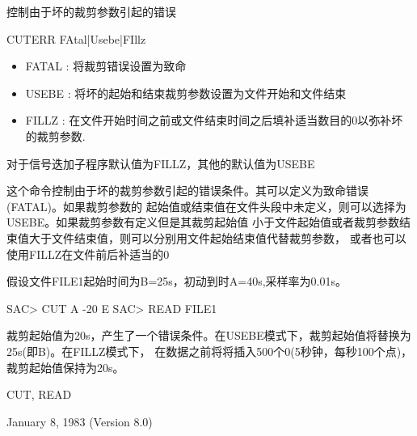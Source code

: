 \label{cmd:cuterr}

控制由于坏的裁剪参数引起的错误

CUTERR FAtal|Usebe|FIllz

\begin{itemize}
\item FATAL : 将裁剪错误设置为致命
\item USEBE : 将坏的起始和结束裁剪参数设置为文件开始和文件结束 
\item FILLZ : 在文件开始时间之前或文件结束时间之后填补适当数目的0以弥补坏的裁剪参数.
\end{itemize}

对于信号迭加子程序默认值为FILLZ，其他的默认值为USEBE

这个命令控制由于坏的裁剪参数引起的错误条件。其可以定义为致命错误(FATAL)。如果裁剪参数的
起始值或结束值在文件头段中未定义，则可以选择为USEBE。如果裁剪参数有定义但是其裁剪起始值
小于文件起始值或者裁剪参数结束值大于文件结束值，则可以分别用文件起始结束值代替裁剪参数，
或者也可以使用FILLZ在文件前后补适当的0

假设文件FILE1起始时间为B=25s，初动到时A=40s,采样率为0.01s。
\begin{SACCode}
SAC> CUT A -20 E
SAC> READ FILE1
\end{SACCode}
裁剪起始值为20s，产生了一个错误条件。在USEBE模式下，裁剪起始值将替换为25s(即B)。在FILLZ模式下，
在数据之前将将插入500个0(5秒钟，每秒100个点)，裁剪起始值保持为20s。

CUT, READ

January 8, 1983 (Version 8.0)
